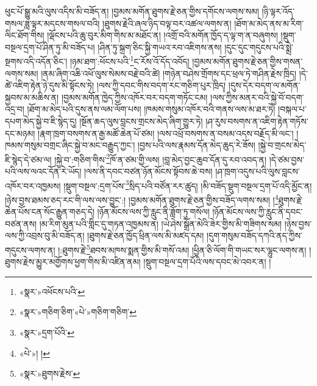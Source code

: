 ཕུང་པོ་སྒྱུ་མའི་ལུས་འདིས་མི་བཟོད་ན། །བྱམས་མགོན་ཐུགས་རྗེ་ཅན་གྱིས་དགོངས་ལགས་སམ། །ཉི་ལྟར་འོད་གསལ་ཟླ་ལྟར་མདངས་གསལ་བའི། །ཐུགས་རྗེའི་ཞལ་ཉིད་བལྟ་བར་འཚལ་ལགས་ན། །ཐོག་མ་མེད་ནས་མ་རིག་ལིང་ཐོག་གིས། །ལྡོངས་པའི་ཆུ་བུར་མིག་གིས་མ་མཐོང་ན། །འགྲོ་བའི་མགོན་ཁྱོད་ད་ལྟ་ག་ན་བཞུགས། །སྡུག་བསྔལ་དྲག་པོ་ཤིན་ཏུ་མི་བཟོད་པ། །ཤིན་ཏུ་སྐྲག་ཅིང་སྐྱི་གཡའ་རབ་འཇིགས་ནས། །དུང་དུང་གདུངས་པའི་སྨྲེ་སྔགས་འདི་འདོན་ཅིང་། །ཉམ་ཐག་:ཕོངས་པའི་\footnote{«སྣར་»འཕོངས་པའི་}ང་རོས་འོ་དོད་འབོད། །བྱམས་མགོན་ཐུགས་རྗེ་ཅན་གྱིས་གསན་ལགས་སམ། །ནམ་ཞིག་འཆི་འཕོ་ལུས་སེམས་བརྗེ་བའི་ཚེ། །གཉེན་བཤེས་གྲོགས་དང་ཕྲལ་ཏེ་གཤིན་རྗེས་ཁྲིད། །དེ་ཚེ་འཇིག་རྟེན་ཉེ་དུས་མི་སྟོངས་ཏེ། །ལས་ཀྱི་དབང་གིས་བདག་རང་གཅིག་པུར་ཁྲིད། །དུས་དེར་བདག་ལ་མགོན་སྐྱབས་མ་མཆིས་ན། །བྱམས་མགོན་ཁྱེད་ཀྱིས་འཁོར་བར་བདག་གཏོང་ངམ། །ལས་ཀྱིས་མནར་བའི་སྐྱེ་བོ་བདག་འདྲ་བ། །ཐོག་མ་མེད་པའི་དུས་ནས་ལམ་ལོག་པས། །ཁམས་གསུམ་འཁོར་བའི་གནས་ལས་མ་ཐར་ཏེ། །བསྐལ་པ་དཔག་མེད་སྐྱེ་བ་ཇི་སྙེད་དུ། །སྔོན་ཆད་ལུས་བླངས་གྲངས་མེད་ཞིག་གྱུར་ཏེ། །ཤ་རུས་བསགས་ན་འཇིག་རྟེན་གཏོས་དང་མཉམ། །རྣག་ཁྲག་བསགས་ན་རྒྱ་མཚོ་ཆེན་པོ་ཙམ། །ལས་འཕྲོ་བསགས་ན་བསམ་འདས་བརྗོད་མི་ལང་། །ཁམས་གསུམ་བགྲང་ཞིང་སྐྱེ་བ་མང་བརྒྱུད་ཀྱང་། །བྱས་པའི་ལས་རྣམས་དོན་མེད་ཆུད་རེ་ཟོས། །སྐྱེ་བ་གྲངས་མེད་ཇི་སྙེད་དེ་ཙམ་ལ། །སྐྱེ་བ་:གཅིག་གིས་\footnote{«སྣར་»གཅིག་ཅིག་«པེ་»གཅིག་གཅིག་}ཁོ་ན་ཙམ་གྱི་ལས། །བླ་མེད་བྱང་ཆུབ་དོན་དུ་རབ་འབད་ན། །དེ་ཙམ་བྱས་པའི་ལས་ལའང་དོན་རེ་ཡོད། །ལས་ནི་དབང་བཙན་ཉོན་མོངས་སྟོབས་ཆེ་བས། །ཤ་ཁྲག་འདུས་པའི་ལུས་བླངས་འཁོར་བར་འཁྱམས། །སྡུག་བསྔལ་:དྲག་པོས་\footnote{«སྣར་»དྲག་པོའི་}སྲིད་པའི་བཙོན་རར་ཚུད། །མི་བཟོད་སྡུག་བསྔལ་དྲག་པོ་འདི་མྱོང་ན། །ཉེས་བྱས་ཐམས་ཅད་རང་གི་ལས་ལས་བྱུང་:། །བྱམས་མགོན་ཐུགས་རྗེ་ཅན་གྱིས་བཟོད་ལགས་སམ། །\footnote{«པེ་»། །}ཐུགས་རྗེ་ཆེན་པོས་ངན་སོང་རྒྱུན་གཅད་དེ། །ཉོན་མོངས་ལས་ཀྱི་རླུང་ནི་ཟློག་ཏུ་གསོལ། །ཉོན་མོངས་ལས་ཀྱི་རླུང་ནི་དབང་བཙན་ནས། །མ་རིག་མུན་པའི་གླིང་དུ་གཏན་འཁྱམས་ན། །ཡེ་ཤེས་སྒྲོན་མེའི་ཟེར་གྱིས་མི་གཟིགས་སམ། །ཉེས་བྱས་ལས་ཀྱི་འབྲས་བུ་མི་བཟོད་ན། །ཐུགས་རྗེ་ཅན་ཁྱོད་ཕྲིན་ལས་མི་མཛད་དམ། །དུག་གསུམ་བཟོད་དཀའི་ནད་ཀྱིས་གདུངས་ལགས་ན། །:ཐུགས་རྗེ་\footnote{«སྣར་»ཐུགས་རྗེས་}ཐབས་མཁས་སྨན་གྱིས་མི་གསོ་འམ། །ཕྱིན་ཅི་ལོག་གི་གཡང་སར་ལྷུང་ལགས་ན། །ཐུགས་རྗེས་མྱུར་མགྱོགས་ཕྱག་གིས་མི་འཛིན་ནམ། །སྡུག་བསྔལ་དྲག་པོའི་ལས་དབང་མེ་འབར་ན། །
